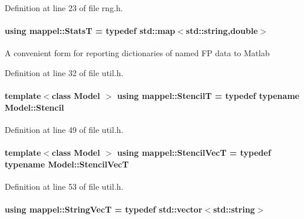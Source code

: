 Definition at line 23 of file rng.\+h.

\paragraph[{\texorpdfstring{StatsT}{StatsT}}]{\setlength{\rightskip}{0pt plus 5cm}using {\bf mappel\+::\+StatsT} = typedef std\+::map$<$std\+::string,double$>$}\hypertarget{namespacemappel_a04ab395b0cf82c4ce68a36b2212649a5}{}\label{namespacemappel_a04ab395b0cf82c4ce68a36b2212649a5}
A convenient form for reporting dictionaries of named FP data to Matlab 

Definition at line 32 of file util.\+h.

\paragraph[{\texorpdfstring{StencilT}{StencilT}}]{\setlength{\rightskip}{0pt plus 5cm}template$<$class Model $>$ using {\bf mappel\+::\+StencilT} = typedef typename Model\+::\+Stencil}\hypertarget{namespacemappel_a3a06598240007876f8c4bf834ad86197}{}\label{namespacemappel_a3a06598240007876f8c4bf834ad86197}


Definition at line 49 of file util.\+h.

\paragraph[{\texorpdfstring{Stencil\+VecT}{StencilVecT}}]{\setlength{\rightskip}{0pt plus 5cm}template$<$class Model $>$ using {\bf mappel\+::\+Stencil\+VecT} = typedef typename Model\+::\+Stencil\+VecT}\hypertarget{namespacemappel_a62f73447ef1973cca188b1b801864f7e}{}\label{namespacemappel_a62f73447ef1973cca188b1b801864f7e}


Definition at line 53 of file util.\+h.

\paragraph[{\texorpdfstring{String\+VecT}{StringVecT}}]{\setlength{\rightskip}{0pt plus 5cm}using {\bf mappel\+::\+String\+VecT} = typedef std\+::vector$<$std\+::string$>$}\hypertarget{namespacemappel_aae88cf18bccfbb789a6019bcfbbfca68}{}\label{namespacemappel_aae88cf18bccfbb789a6019bcfbbfca68}


